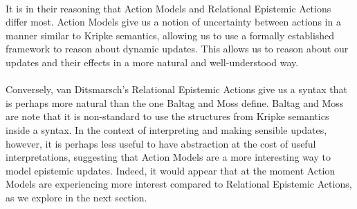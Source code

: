 \documentclass[12pt, a4paper, titlepage]{scrartcl}
\begin{document}
\\
It is in their reasoning that Action Models and Relational Epistemic Actions
differ most.
Action Models give us a notion of uncertainty between actions in a manner
similar to Kripke semantics, allowing us to use a formally established framework
to reason about dynamic updates.
This allows us to reason about our updates and their effects in a more natural
and well-understood way.\\
\\
Conversely, van Ditsmarsch's Relational Epistemic Actions give us a syntax that
is perhaps more natural than the one Baltag and Moss define.
Baltag and Moss are note that it is non-standard to use the structures from
Kripke semantics inside a syntax.
In the context of interpreting and making sensible updates, however, it is
perhaps less useful to have abstraction at the cost of useful interpretations,
suggesting that Action Models are a more interesting way to model epistemic
updates.
Indeed, it would appear that at the moment Action Models are experiencing more
interest compared to Relational Epistemic Actions, as we explore in the next
section.
\end{document}
